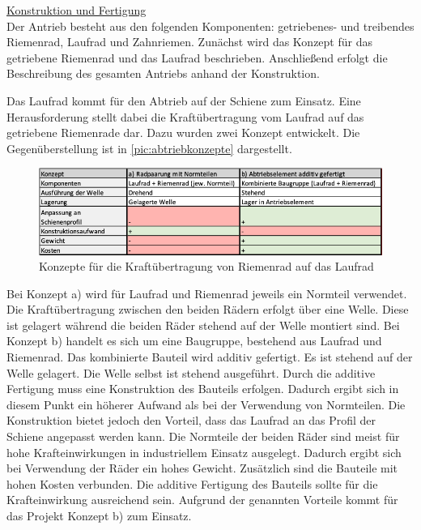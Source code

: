\underline{Konstruktion und Fertigung}\\
Der Antrieb besteht aus den folgenden Komponenten: getriebenes- und treibendes Riemenrad, Laufrad und Zahnriemen. Zunächst wird das Konzept für das getriebene Riemenrad und das Laufrad beschrieben. Anschließend erfolgt die Beschreibung des gesamten Antriebs anhand der Konstruktion.  

Das Laufrad kommt für den Abtrieb auf der Schiene zum Einsatz. Eine Herausforderung stellt dabei die Kraftübertragung vom Laufrad auf das getriebene Riemenrade dar. Dazu wurden zwei Konzept entwickelt. Die Gegenüberstellung ist in \autoref{pic:abtriebkonzepte} dargestellt.

\begin{figure}[h]
	\begin{center}
		\includegraphics[width=17cm]{abtriebkonzepte.png}
		\caption{Konzepte für die Kraftübertragung von Riemenrad auf das Laufrad}
		\label{pic:abtriebkonzepte}
	\end{center}
\end{figure}
\newpage
Bei Konzept a) wird für  Laufrad und Riemenrad jeweils ein Normteil verwendet. Die Kraftübertragung zwischen den beiden Rädern erfolgt über eine Welle. Diese ist gelagert während die beiden Räder stehend auf der Welle montiert sind.
Bei Konzept b) handelt es sich um eine Baugruppe, bestehend aus Laufrad und Riemenrad. Das kombinierte Bauteil wird additiv gefertigt. Es ist stehend auf der Welle gelagert.  Die Welle selbst ist stehend ausgeführt. 
Durch die additive Fertigung muss eine Konstruktion des Bauteils erfolgen. Dadurch ergibt sich in diesem Punkt ein höherer Aufwand als bei der Verwendung von Normteilen. Die Konstruktion bietet jedoch den Vorteil, dass das Laufrad an das Profil der Schiene angepasst werden kann. Die Normteile der beiden Räder sind meist für hohe Krafteinwirkungen in industriellem Einsatz ausgelegt. Dadurch ergibt sich bei Verwendung der Räder ein hohes Gewicht. Zusätzlich sind die Bauteile mit hohen Kosten verbunden. Die additive Fertigung des Bauteils sollte für die Krafteinwirkung ausreichend sein. Aufgrund der genannten Vorteile kommt für das Projekt Konzept b) zum Einsatz.  


